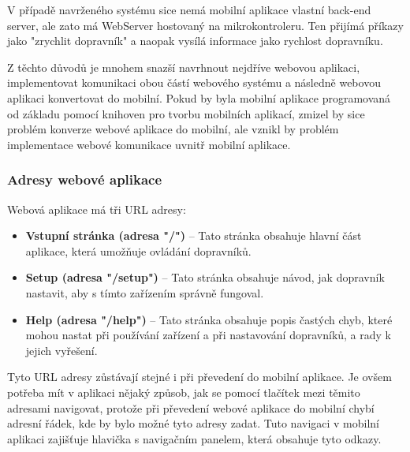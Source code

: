 V případě navrženého systému sice nemá mobilní aplikace vlastní back-end server, ale zato má WebServer hostovaný na mikrokontroleru. Ten přijímá příkazy jako "zrychlit dopravník" a naopak vysílá informace jako rychlost dopravníku.

Z těchto důvodů je mnohem snazší navrhnout nejdříve webovou aplikaci, implementovat komunikaci obou částí webového systému a následně webovou aplikaci konvertovat do mobilní. Pokud by byla mobilní aplikace programovaná od základu pomocí knihoven pro tvorbu mobilních aplikací, zmizel by sice problém konverze webové aplikace do mobilní, ale vznikl by problém implementace webové komunikace uvnitř mobilní aplikace.

\subsubsection{Adresy webové aplikace}\label{sec:AdresyWeboveAplikace}

Webová aplikace má tři URL adresy:
\begin{itemize}
	\item \textbf{Vstupní stránka (adresa "/")} – Tato stránka obsahuje hlavní část aplikace, která umožňuje ovládání dopravníků.
	\item \textbf{Setup (adresa "/setup")} – Tato stránka obsahuje návod, jak dopravník nastavit, aby s tímto zařízením správně fungoval.
	\item \textbf{Help (adresa "/help")} – Tato stránka obsahuje popis častých chyb, které mohou nastat při používání zařízení a při nastavování dopravníků, a rady k jejich vyřešení.
\end{itemize}

Tyto URL adresy zůstávají stejné i při převedení do mobilní aplikace. Je ovšem potřeba mít v aplikaci nějaký způsob, jak se pomocí tlačítek mezi těmito adresami navigovat, protože při převedení webové aplikace do mobilní chybí adresní řádek, kde by bylo možné tyto adresy zadat. Tuto navigaci v mobilní aplikaci zajišťuje hlavička s navigačním panelem, která obsahuje tyto odkazy.


